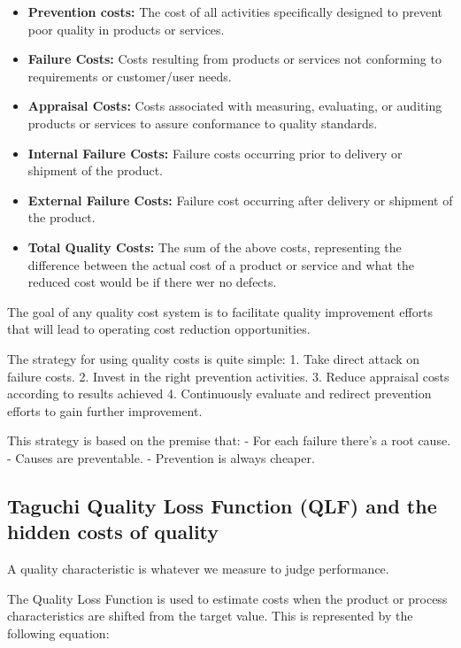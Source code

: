 \documentclass[11pt]{article}
\providecommand{\tightlist}{%
      \setlength{\itemsep}{0pt}\setlength{\parskip}{0pt}}
\begin{document}
\begin{itemize}
\tightlist
\item
  \textbf{Prevention costs:} The cost of all activities specifically
  designed to prevent poor quality in products or services.
\item
  \textbf{Failure Costs:} Costs resulting from products or services not
  conforming to requirements or customer/user needs.
\item
  \textbf{Appraisal Costs:} Costs associated with measuring, evaluating,
  or auditing products or services to assure conformance to quality
  standards.
\item
  \textbf{Internal Failure Costs:} Failure costs occurring prior to
  delivery or shipment of the product.
\item
  \textbf{External Failure Costs:} Failure cost occurring after delivery
  or shipment of the product.
\item
  \textbf{Total Quality Costs:} The sum of the above costs, representing
  the difference between the actual cost of a product or service and
  what the reduced cost would be if there wer no defects.
\end{itemize}



The goal of any quality cost system is to facilitate quality improvement
efforts that will lead to operating cost reduction opportunities.

The strategy for using quality costs is quite simple: 1. Take direct
attack on failure costs. 2. Invest in the right prevention activities.
3. Reduce appraisal costs according to results achieved 4. Continuously
evaluate and redirect prevention efforts to gain further improvement.

This strategy is based on the premise that: - For each failure there's a
root cause. - Causes are preventable. - Prevention is always cheaper.

\hypertarget{taguchi-quality-loss-function-qlf-and-the-hidden-costs-of-quality}{%
\subsection{Taguchi Quality Loss Function (QLF) and the hidden costs of
quality}\label{taguchi-quality-loss-function-qlf-and-the-hidden-costs-of-quality}}

A quality characteristic is whatever we measure to judge performance.

The Quality Loss Function is used to estimate costs when the product or
process characteristics are shifted from the target value. This is
represented by the following equation:
\end{document}
